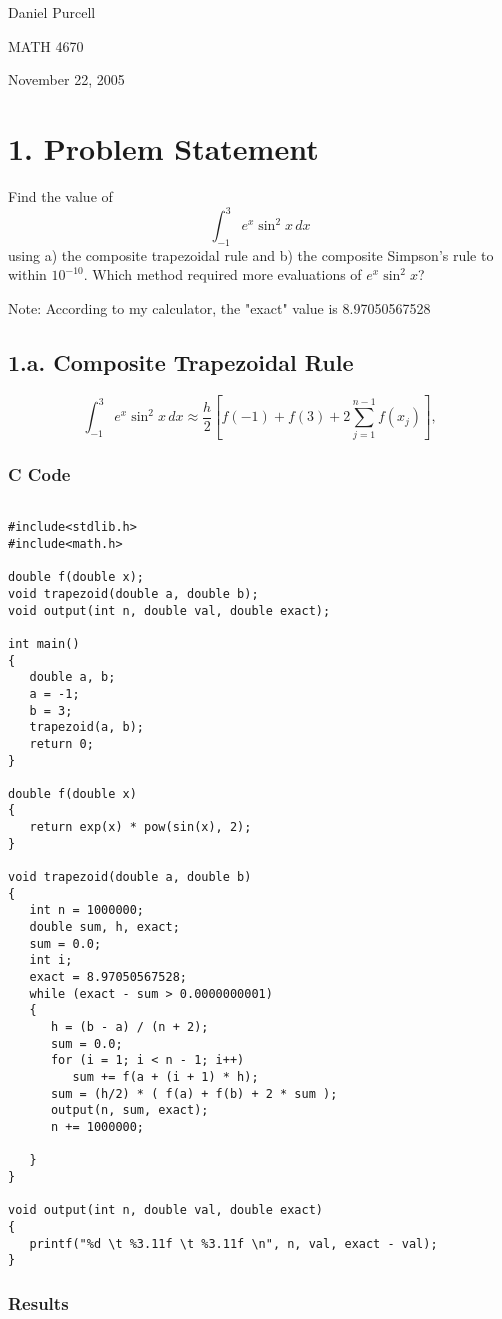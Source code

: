\documentclass{article}
\begin{document}
Daniel Purcell

MATH 4670

November 22, 2005

\section*{1.	Problem Statement}
Find the value of 
$$
\int_{-1}^{3} e^x \sin^2{x} \, dx
$$
using a) the composite trapezoidal rule and b) the composite Simpson's rule to
within $10^{-10}$.  Which method required more evaluations of $e^x \sin^2{x}$?


Note: According to my calculator, the "exact" value is 8.97050567528
\subsection*{1.a.	Composite Trapezoidal Rule}
$$
\int_{-1}^{3} e^x \sin^2{x} \, dx \approx 
	\frac{h}{2} \left[ f(-1) + f(3) + 2 \sum_{j=1}^{n-1} f(x_j) \right],
$$

\subsubsection*{C Code}

\begin{verbatim}

#include<stdlib.h>
#include<math.h>

double f(double x);
void trapezoid(double a, double b);
void output(int n, double val, double exact);

int main()
{
   double a, b;
   a = -1;
   b = 3;
   trapezoid(a, b); 
   return 0;
}

double f(double x)
{
   return exp(x) * pow(sin(x), 2);
}

void trapezoid(double a, double b)
{
   int n = 1000000;
   double sum, h, exact;
   sum = 0.0;
   int i;
   exact = 8.97050567528;
   while (exact - sum > 0.0000000001) 
   {
      h = (b - a) / (n + 2);
      sum = 0.0;
      for (i = 1; i < n - 1; i++)
         sum += f(a + (i + 1) * h);
      sum = (h/2) * ( f(a) + f(b) + 2 * sum );
      output(n, sum, exact);
      n += 1000000;
      
   }
}

void output(int n, double val, double exact)
{
   printf("%d \t %3.11f \t %3.11f \n", n, val, exact - val);
}

\end{verbatim}

\subsubsection*{Results}
\end{document}
